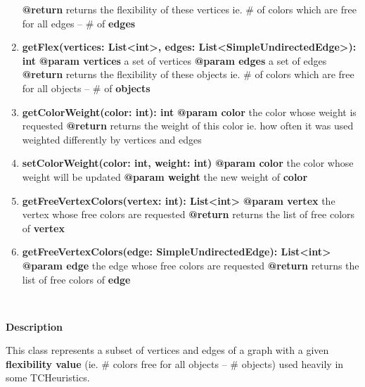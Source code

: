 \begin{enumerate}[\#]
{			\textbf{@return} returns the flexibility of these vertices ie. \# of colors which are free for all edges -- \# of \textbf{edges}
		}
		\item{
			\textbf{getFlex(vertices: List<int>, edges: List<SimpleUndirectedEdge>): int} \newline
			\textbf{@param vertices} a set of vertices \newline
			\textbf{@param edges} a set of edges \newline
			\textbf{@return} returns the flexibility of these objects ie. \# of colors which are free for all objects -- \# of \textbf{objects}
		}
		\item{
			\textbf{getColorWeight(color: int): int} \newline
			\textbf{@param color} the color whose weight is requested \newline
			\textbf{@return} returns the weight of this color ie. how often it was used weighted differently by vertices and edges
		}
		\item{
			\textbf{setColorWeight(color: int, weight: int)} \newline
			\textbf{@param color} the color whose weight will be updated \newline
			\textbf{@param weight} the new weight of \textbf{color}
		}
		\item{
			\textbf{getFreeVertexColors(vertex: int): List<int>} \newline
			\textbf{@param vertex} the vertex whose free colors are requested \newline
			\textbf{@return} returns the list of free colors of \textbf{vertex}
		}
		\item{
			\textbf{getFreeVertexColors(edge: SimpleUndirectedEdge): List<int>} \newline
			\textbf{@param edge} the edge whose free colors are requested \newline
			\textbf{@return} returns the list of free colors of \textbf{edge}
		}
	\end{enumerate}
	
	
	~\newline
	~\newline
	~\newline
	
	
	\textbf{Description}
	
	This class represents a subset of vertices and edges of a graph with a given \textbf{flexibility value} (ie. \# colors free for all objects -- \# objects) used heavily in some TCHeuristics.
	
